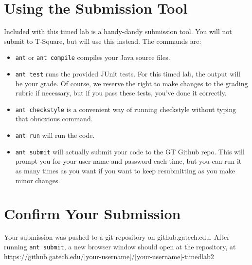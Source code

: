 \documentclass[12pt]{article}
\newcommand{\modules}{../../../../latex/}
\begin{document}


\section{Using the Submission Tool}
Included with this timed lab is a handy-dandy submission tool. You will not submit to T-Square, but will use this instead.
The commands are:

\begin{itemize}
\item {\tt ant} or {\tt ant compile} compiles your Java source files.
\item {\tt ant test} runs the provided JUnit tests. For this timed lab, the output will be your grade. Of course, we reserve the right to make changes to the grading rubric if necessary, but if you pass these tests, you've
done it correctly.
\item {\tt ant checkstyle} is a convenient way of running checkstyle without typing that obnoxious command.
\item {\tt ant run} will run the code.
\item {\tt ant submit} will actually submit your code to the GT Github repo. This will prompt you for your user name and password each time, but you can run it as many times as you want if you want to keep resubmitting as you make minor changes.
\end{itemize}


\section{Confirm Your Submission}
Your submission was pushed to a git repository on github.gatech.edu. After running {\tt ant submit}, a new
browser window should open at the repository, at https://github.gatech.edu/[your-username]/[your-username]-timedlab2
\end{document}
